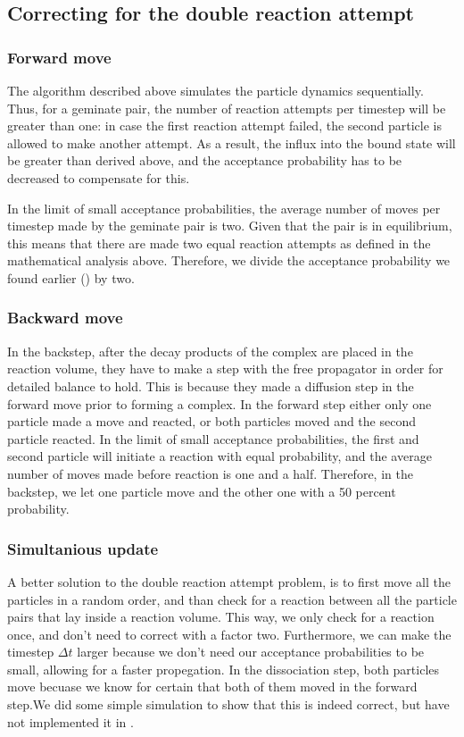 \subsection{Correcting for the double reaction attempt}

\subsubsection{Forward move}
The algorithm described above simulates the particle dynamics sequentially. Thus, for a geminate pair, the number of reaction attempts per timestep will be greater than one: in case the first reaction attempt failed, the second particle is allowed to make another attempt. As a result, the influx into the bound state will be greater than derived above, and the acceptance probability has to be decreased to compensate for this. 

In the limit of small acceptance probabilities, the average number of moves per timestep made by the geminate pair is two. Given that the pair is in equilibrium, this means that there are made two equal reaction attempts as defined in the mathematical analysis above. Therefore, we divide the acceptance probability we found earlier () by two.

\subsubsection{Backward move}
In the backstep, after the decay products of the complex are placed in the reaction volume, they have to make a step with the free propagator in order for detailed balance to hold. This is because they made a diffusion step in the forward move prior to forming a complex. In the forward step either only one particle made a move and reacted, or both particles moved and the second particle reacted. In the limit of small acceptance probabilities, the first and second particle will initiate a reaction with equal probability, and the average number of moves made before reaction is one and a half. Therefore, in the backstep, we let one particle move and the other one with a 50 percent probability.

\subsubsection{Simultanious update}
A better solution to the double reaction attempt problem, is to first move all the particles in a random order, and than check for a reaction between all the particle pairs that lay inside a reaction volume. This way, we only check for a reaction once, and don't need to correct with a factor two. Furthermore, we can make the timestep $\Delta t$ larger because we don't need our acceptance probabilities to be small, allowing for a faster propegation. In the dissociation step, both particles move becuase we know for certain that both of them moved in the forward step.We did some simple simulation to show that this is indeed correct, but have not implemented it in \GFRD.


